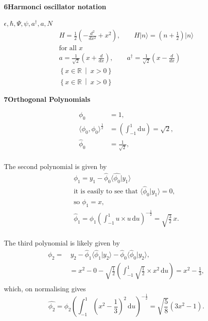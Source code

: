 \documentclass[12pt]{article}
\newcommand{\problem}[2]{%
    \par\vspace{1em}
    \noindent\textbf{#1\quad #2}
    \par\smallskip
}
\begin{document}
\problem{6}{Harmonci oscillator notation}
$\epsilon, \hbar, \Psi, \psi, a^\dagger, a, N$
\begin{equation}
    \begin{gathered}
      H = \frac{1}{2}\left(-\frac{d^2}{dx^2}+x^2\right),
      \qquad
      H\lvert n\rangle = \left(n+\frac{1}{2}\right)\lvert n\rangle \\
      \text{for all } x\\
      a = \frac{1}{\sqrt{2}}\left(x+\frac{d}{dx}\right),
      \qquad
      a^\dagger = \frac{1}{\sqrt{2}}\left(x-\frac{d}{dx}\right) \\
      \left\{x\in\mathbb{R}\ \middle| \ x>0\right\} \\
      \left\{x\in\mathbb{R}\ \middle| \ x>0\right\}
    \end{gathered}
\end{equation}

\pagebreak
\problem{7}{Orthogonal Polynomials}
\begin{equation}
\begin{split}
  \phi_0 &= 1, \\
  \langle \phi_0,\phi_0  \rangle ^{\frac{1}{2}}&=\left(\int_{-1}^{1} \mathrm{d}u\right) = \sqrt{2},\\
  \hat{\phi}_0 &= \frac{1}{\sqrt{2}},\\
\end{split}
\end{equation}

The second polynomial is given by
\begin{equation}
\begin{split}
    \phi_1 = y_1 - \hat{\phi}_0 \langle \hat{\phi_0} \lvert y_1 \rangle\\
    \text{it is easily to see that } \langle \hat{\phi}_0 \lvert y_1 \rangle = 0,\\
    \text{so } \phi_1 = x,\\
    \hat{\phi}_1 = \phi_1 \left(\int_{-1}^{1} u \times u \,\mathrm{d}u\right)^{-\frac{1}{2}} = \sqrt{\frac{3}{2}}\,x.\\
\end{split}
\end{equation}

The third polynomial is likely given by
\begin{equation}
\begin{split}
  \phi_2 =& \,y_2 - \hat{\phi}_1 \langle \hat{\phi}_1 \lvert y_2  \rangle - \hat{\phi}_0 \langle \hat{\phi}_0 \lvert y_2  \rangle,\\
  &= x^2 - 0 - \sqrt{\frac{1}{2}} \left(\int_{-1}^{1} \sqrt{\frac{1}{2}} \times x^2 \,\mathrm{d}u\right) = x^2 - \frac{1}{3},\\
\end{split}
\end{equation}
which, on normalising gives
\begin{equation}
    \hat{\phi_2} = \phi_2 \left(\int_{-1}^{1} (x^2 - \frac{1}{3})^2 \,\mathrm{d}u \right)^{-\frac{1}{2}} = \sqrt{\frac{5}{8}} \left(3x^2 - 1\right).
\end{equation}
\end{document}

